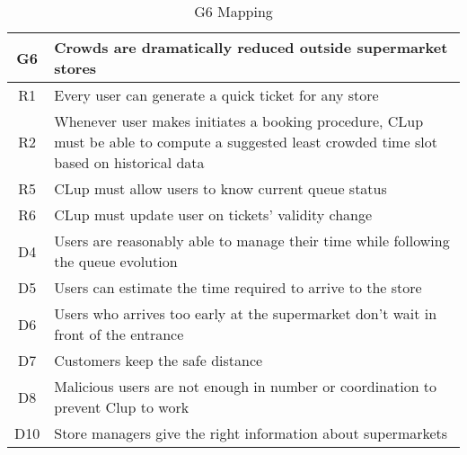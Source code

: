 \begin{table}[H]
	\begin{tabular}{c|l}
		\cellcolor{lightgray}\textbf{G6} & \textbf{Crowds are dramatically reduced outside supermarket stores}\\
		\hline
		\cellcolor{YellowGreen} R1 & Every user can generate a quick ticket for any store\\
		\hline
		\cellcolor{YellowGreen} R2 & Whenever user makes initiates a booking procedure, CLup must be able to compute a suggested least crowded time slot based on historical data  \\
		\hline
		\cellcolor{YellowGreen} R5 & CLup must allow users to know current queue status\\
		\hline
		\cellcolor{YellowGreen} R6 & CLup must update user on tickets' validity change\\
		\hline
		\cellcolor{YellowOrange} D4 & Users are reasonably able to manage their time while following the queue evolution\\
		\hline
		\cellcolor{YellowOrange} D5 & Users can estimate the time required to arrive to the store\\
		\hline
		\cellcolor{YellowOrange} D6 & Users who arrives too early at the supermarket don't wait in front of the entrance\\
		\hline
		\cellcolor{YellowOrange} D7 & Customers keep the safe distance\\
		\hline
		\cellcolor{YellowOrange} D8 & Malicious users are not enough in number or coordination to prevent Clup to work\\
		\hline
		\cellcolor{YellowOrange} D10 & Store managers give the right information about supermarkets\\
	\end{tabular}
	\label{tab:G6Mapping}
	\caption{G6 Mapping}
\end{table}

